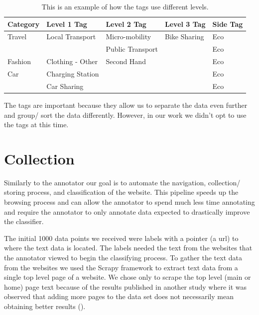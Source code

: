 \begin{table}[h]
\begin{tabular}{|l|l|l|l|l|}
\hline
Category    & Level 1 Tag           & Level 2 Tag        & Level 3 Tag  & Side Tag \\ \hline
Travel      & Local Transport       & Micro-mobility     & Bike Sharing & Eco      \\ \hline
            &                       & Public Transport   &              & Eco      \\ \hline
Fashion     & Clothing - Other      & Second Hand        &              & Eco      \\ \hline
Car         & Charging Station      &                    &              & Eco      \\ \hline
            & Car Sharing           &                    &              & Eco      \\ \hline
\end{tabular}
\caption{This is an example of how the tags use different levels.}
\label{tab:tags}
\end{table}

The tags are important because they allow us to separate the data even further and group/ sort the data differently. However, in our work we didn't opt to use the tags at this time.

\section{Collection}

Similarly to the annotator our goal is to automate the navigation, collection/ storing process, and classification of the website. This pipeline speeds up the browsing process and can allow the annotator to spend much less time annotating and require the annotator to only annotate data expected to drastically improve the classifier.

The initial 1000 data points we received were labels with a pointer (a url) to where the text data is located. The labels needed the text from the websites that the annotator viewed to begin the classifying process. To gather the text data from the websites we used the Scrapy framework to extract text data from a single top level page of a website. We chose only to scrape the top level (main or home) page text because of the results published in another study where it was observed that adding more pages to the data set does not necessarily mean obtaining better results (\cite{sahid2019ecommerce}). 

